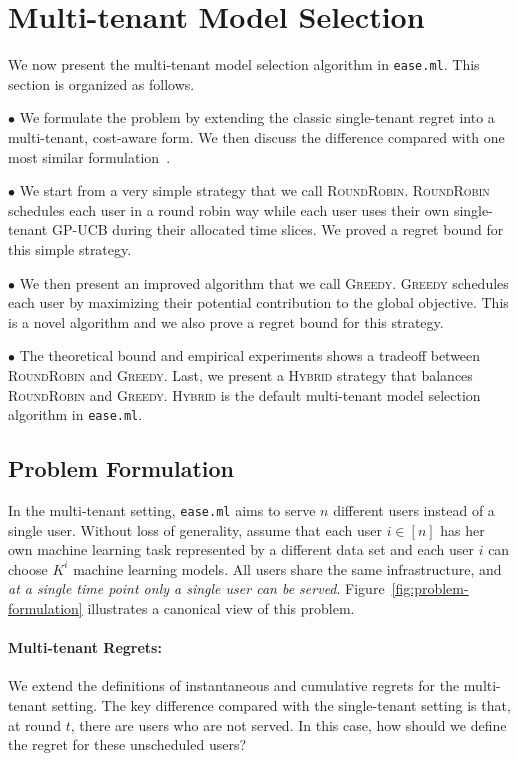 \documentclass[letterpaper]{vldb}
\newcommand{\eml}{\texttt{ease.ml}\xspace}
\newcommand{\rr}{\textsc{RoundRobin}\xspace}
\newcommand{\hybrid}{\textsc{Hybrid}\xspace}
\newcommand{\greedy}{\textsc{Greedy}\xspace}
\begin{document}
\section{Multi-tenant Model Selection}\label{sec:multitenant}

We now present the multi-tenant model selection
algorithm in \eml. This section is organized as follows.

\noindent
$\bullet$ We formulate the problem 
by extending the classic single-tenant regret
into a multi-tenant, cost-aware form. We then 
discuss the difference compared with
one most similar formulation~\cite{XXX}.

\noindent
$\bullet$
We start from a very simple strategy that we call
\rr. \rr schedules
each user in a round robin way while each user
uses their own single-tenant GP-UCB
during their allocated time slices. We proved 
a regret bound for this simple strategy.

\noindent
$\bullet$
We then present an improved algorithm that we
call \greedy. \greedy schedules
each user by maximizing their potential contribution
to the global objective. This is a novel algorithm
and we also prove a regret bound for this strategy.

\noindent
$\bullet$
The theoretical bound and empirical experiments
shows a tradeoff between \rr and
\greedy. Last, we present a \hybrid 
strategy that balances 
\rr and \greedy. \hybrid is the 
default multi-tenant model selection algorithm
in \eml.


\vspace{-0.5em}
\subsection{Problem Formulation}

In the multi-tenant setting, \eml aims
to serve $n$ different users instead of a single user.
Without loss of generality, assume that
each user $i\in[n]$ has her own machine learning 
task represented by a different data set
and each user $i$ can choose
$K^{i}$ machine learning models.
All users share the same infrastructure,
and {\em at a single time point only
a single user can be served}.
Figure~\ref{fig:problem-formulation} illustrates 
a canonical view of this problem.

\vspace{-0.5em}
\paragraph*{Multi-tenant Regrets:} 
We extend the definitions of instantaneous and cumulative 
regrets for the multi-tenant setting. The key difference
compared with the single-tenant setting is that,
at round $t$, there are users who are not
served. In this case, how should we define
the regret for these unscheduled users?
\end{document}
